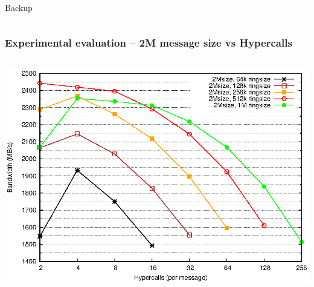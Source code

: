 \documentclass[red,slidestop,notes,compress,mathserif]{beamer}
\begin{document}
\begin{frame}
\frametitle{}
                \vfill%
\begin{columns}
        \begin{center}
                \vfill%
        \end{center}
\end{columns}
                \vfill%
\end{frame}
%
\begin{frame}
\frametitle{}
                \vfill%
\begin{columns}
        \begin{center}
        \begin{center}
                        {\LARGE Backup}
        \end{center}
                \vfill%
        \end{center}
\end{columns}
                \vfill%
\end{frame}

\begin{frame}
\frametitle{Experimental evaluation -- 2M message size vs Hypercalls}
\begin{columns}
\includegraphics[width=\textwidth]{figures/2M.eps}
\end{columns}
\end{frame}
\end{document}
